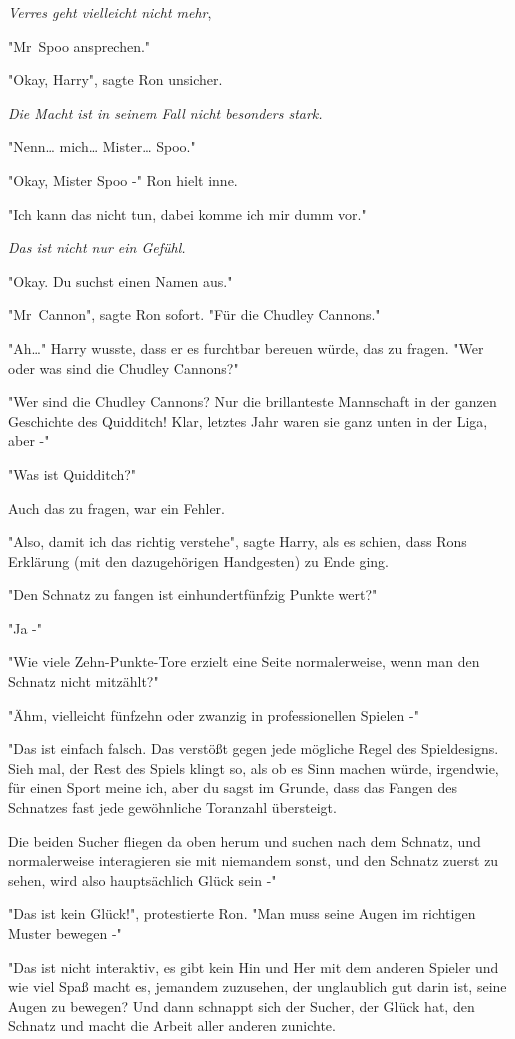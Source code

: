 {\emph{Verres geht vielleicht nicht mehr},

"Mr~Spoo ansprechen."

"Okay, Harry", sagte Ron unsicher.

\emph{Die Macht ist in seinem Fall nicht besonders stark.}

"Nenn… mich… Mister… Spoo."

"Okay, Mister Spoo -" Ron hielt inne.

"Ich kann das nicht tun, dabei komme ich mir dumm vor."

\emph{Das ist nicht nur ein Gefühl.}

"Okay. Du suchst einen Namen aus."

"Mr~Cannon", sagte Ron sofort. "Für die Chudley Cannons."

"Ah…" Harry wusste, dass er es furchtbar bereuen würde, das zu fragen. "Wer oder was sind die Chudley Cannons?"

"Wer sind die Chudley Cannons? Nur die brillanteste Mannschaft in der ganzen Geschichte des Quidditch! Klar, letztes Jahr waren sie ganz unten in der Liga, aber -"

"Was ist Quidditch?"

Auch das zu fragen, war ein Fehler.

"Also, damit ich das richtig verstehe", sagte Harry, als es schien, dass Rons Erklärung (mit den dazugehörigen Handgesten) zu Ende ging.

"Den Schnatz zu fangen ist einhundertfünfzig Punkte wert?"

"Ja -"

"Wie viele Zehn-Punkte-Tore erzielt eine Seite normalerweise, wenn man den Schnatz nicht mitzählt?"

"Ähm, vielleicht fünfzehn oder zwanzig in professionellen Spielen -"

"Das ist einfach falsch. Das verstößt gegen jede mögliche Regel des Spieldesigns. Sieh mal, der Rest des Spiels klingt so, als ob es Sinn machen würde, irgendwie, für einen Sport meine ich, aber du sagst im Grunde, dass das Fangen des Schnatzes fast jede gewöhnliche Toranzahl übersteigt.

Die beiden Sucher fliegen da oben herum und suchen nach dem Schnatz, und normalerweise interagieren sie mit niemandem sonst, und den Schnatz zuerst zu sehen, wird also hauptsächlich Glück sein -"

"Das ist kein Glück!", protestierte Ron. "Man muss seine Augen im richtigen Muster bewegen -"

"Das ist nicht interaktiv, es gibt kein Hin und Her mit dem anderen Spieler und wie viel Spaß macht es, jemandem zuzusehen, der unglaublich gut darin ist, seine Augen zu bewegen? Und dann schnappt sich der Sucher, der Glück hat, den Schnatz und macht die Arbeit aller anderen zunichte.

}
